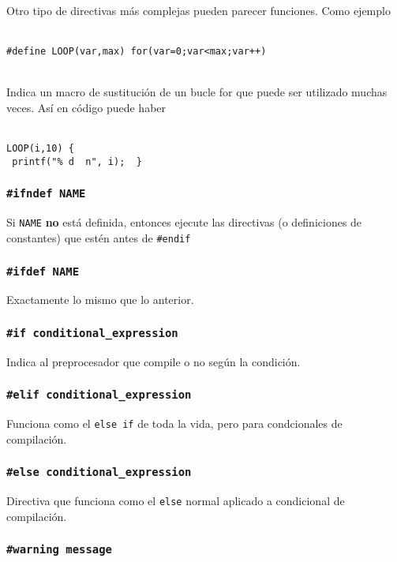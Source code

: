 Otro tipo de directivas más complejas pueden parecer funciones. Como ejemplo \\\

\texttt{\#define LOOP(var,max) for(var=0;var<max;var++) } \\\

Indica un macro de sustitución de un bucle for que puede ser utilizado muchas veces. Así en código puede haber\\\

\texttt{LOOP(i,10) \{ \\\
        printf("\% d \ n", i);  \
    \} }

\subsubsection{\texttt{\#ifndef NAME}}

Si \texttt{NAME} \textbf{no} está definida, entonces ejecute las directivas (o definiciones de constantes) que estén antes de \texttt{\#endif}

\subsubsection{\texttt{\#ifdef NAME}}

Exactamente lo mismo que lo anterior.

\subsubsection{\texttt{\#if conditional\_expression}}

Indica al preprocesador que compile o no según la condición.

\subsubsection{\texttt{\#elif conditional\_expression}}

Funciona como el \texttt{else if} de toda la vida, pero para condcionales de compilación.

\subsubsection{\texttt{\#else conditional\_expression}}

Directiva que funciona como el \texttt{else} normal aplicado a condicional de compilación.

\subsubsection{\texttt{\#warning message}}

